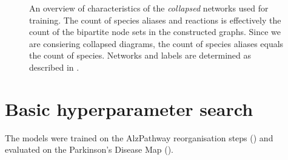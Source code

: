 \documentclass[
	fontsize=10pt, %
	twoside=false, %
	secnumdepth=1, %
  toc=indentunnumbered %
]{kaobook}
\begin{document}
\begin{figure}[h]
\begin{subfigure}{0.32\textwidth}
  \end{subfigure} 
  \caption[
  An overview of characteristics of networks used for training.
  ]{ An overview of characteristics of the \textit{collapsed} networks
    used for training. The count of species aliases and reactions is effectively
    the count of the bipartite node sets in the constructed graphs. Since we are
    consiering collapsed diagrams, the count of species aliases equals the count
    of species.
    Networks and labels are determined as described in
    . }
  \label{fig:maps-summary}
\end{figure}
















\section{Basic hyperparameter search}

The models were trained on the AlzPathway reorganisation steps (\ADMap)
and evaluated on the Parkinson's Disease Map (\PDMap). 
\end{document}

